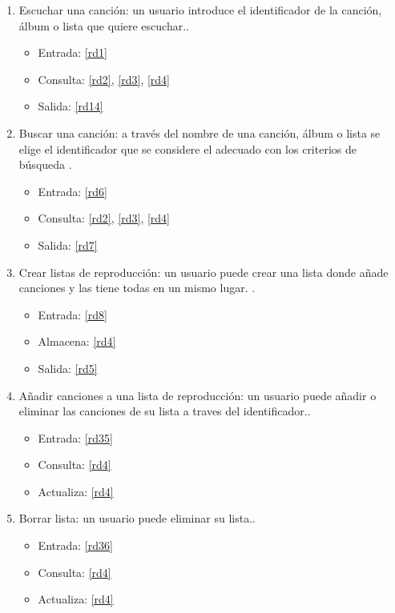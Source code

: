 \documentclass[12pt,a4paper]{article}
\begin{document}
\begin{enumerate}[label=\textnormal{RF\arabic*.}]


    \item Escuchar una canción: un usuario introduce el identificador de la canción, álbum o lista que quiere escuchar.\label{rf1}.
    	\begin{itemize}
			\item Entrada: \ref{rd1}
			\item Consulta: \ref{rd2}, \ref{rd3}, \ref{rd4} 
			\item Salida: \ref{rd14}
		\end{itemize}
		
	 \item Buscar una canción: a través del nombre de una canción, álbum o lista se elige el identificador que se considere el adecuado con los criterios de búsqueda \label{rf2}.
    	\begin{itemize}
			\item Entrada: \ref{rd6}
			\item Consulta: \ref{rd2}, \ref{rd3}, \ref{rd4} 
			\item Salida: \ref{rd7}
		\end{itemize}

	 \item Crear listas de reproducción: un usuario puede crear una lista donde añade canciones y las tiene todas en un mismo lugar. \label{rf3}.
    	\begin{itemize}
			\item Entrada: \ref{rd8}
			\item Almacena: \ref{rd4}
			\item Salida: \ref{rd5}
		\end{itemize}

	 \item Añadir canciones a una lista de reproducción: un usuario puede añadir o eliminar las canciones de su lista a traves del identificador.\label{rf4}.
    	\begin{itemize}
			\item Entrada: \ref{rd35}
			\item Consulta: \ref{rd4}
			\item Actualiza: \ref{rd4}
		\end{itemize}

	 \item Borrar lista: un usuario puede eliminar su lista.\label{rf5}.
    	\begin{itemize}
			\item Entrada: \ref{rd36}
			\item Consulta: \ref{rd4}
			\item Actualiza: \ref{rd4}
		\end{itemize}
		

\end{enumerate}
\end{document}

